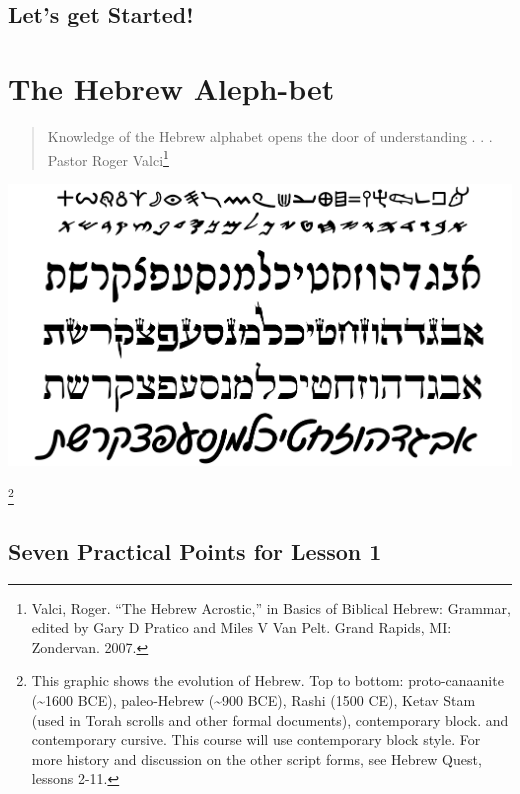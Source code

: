 \documentclass[
]{turabian-researchpaper}
\begin{document}
\hypertarget{lets-get-started}{%
\subsection*{Let's get Started!}\label{lets-get-started}}

\hypertarget{alephbet}{%
\section{The Hebrew Aleph-bet}\label{alephbet}}

\begin{quote}
Knowledge of the Hebrew alphabet opens the door of understanding . . . Pastor Roger Valci\footnote{Valci, Roger. ``The Hebrew Acrostic,'' in Basics of Biblical Hebrew: Grammar, edited by Gary D Pratico and Miles V Van Pelt. Grand Rapids, MI: Zondervan. 2007.}
\end{quote}

\begin{center}\includegraphics[width=400pt]{images/alephbet_multi} \end{center}

\footnote{This graphic shows the evolution of Hebrew. Top to bottom: proto-canaanite (\textasciitilde1600 BCE), paleo-Hebrew (\textasciitilde900 BCE), Rashi (1500 CE), Ketav Stam (used in Torah scrolls and other formal documents), contemporary block. and contemporary cursive. This course will use contemporary block style. For more history and discussion on the other script forms, see Hebrew Quest, lessons 2-11.}

\hypertarget{seven-practical-points-for-lesson-1}{%
\subsection*{Seven Practical Points for Lesson 1}\label{seven-practical-points-for-lesson-1}}
\end{document}

